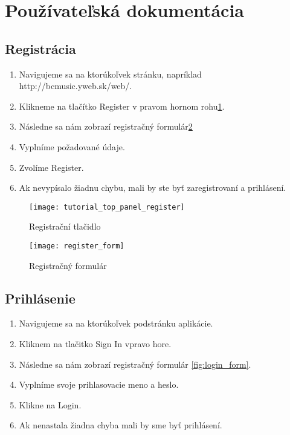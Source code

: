 \newpage
\section{Používateľská dokumentácia}

\subsection{Registrácia}

\begin{enumerate}
\item{Navigujeme sa na ktorúkoľvek stránku, napríklad http://bcmusic.yweb.sk/web/.}
\item{Klikneme na tlačítko Register v pravom hornom rohu\ref{fig:register_button}.}
\item{Následne sa nám zobrazí registračný formulár\ref{fig:register_form}}
\item{Vyplníme požadované údaje.}
\item{Zvolíme Register.}
\item{Ak nevypísalo žiadnu chybu, mali by ste byť zaregistrovaní a prihlásení.}
\end{enumerate}

\begin{figure}
    \begin{center}
        \texttt{[image: tutorial\_top\_panel\_register]}
        \caption{Registrační tlačidlo}
        \label{fig:register_button}
    \end{center}
\end{figure}

\begin{figure}
    \begin{center}
        \texttt{[image: register\_form]}
        \caption{Registračný formulár}
        \label{fig:register_form}
    \end{center}
\end{figure}

\subsection{Prihlásenie}

\begin{enumerate}
\item{Navigujeme sa na ktorúkoľvek podstránku aplikácie.}
\item{Kliknem na tlačitko Sign In vpravo hore.}
\item{Následne sa nám zobrazí registračný formulár \ref{fig:login_form}.}
\item{Vyplníme svoje prihlasovacie meno a heslo.}
\item{Klikne na Login.}
\item{Ak nenastala žiadna chyba mali by sme byť prihlásení.}
\end{enumerate}

